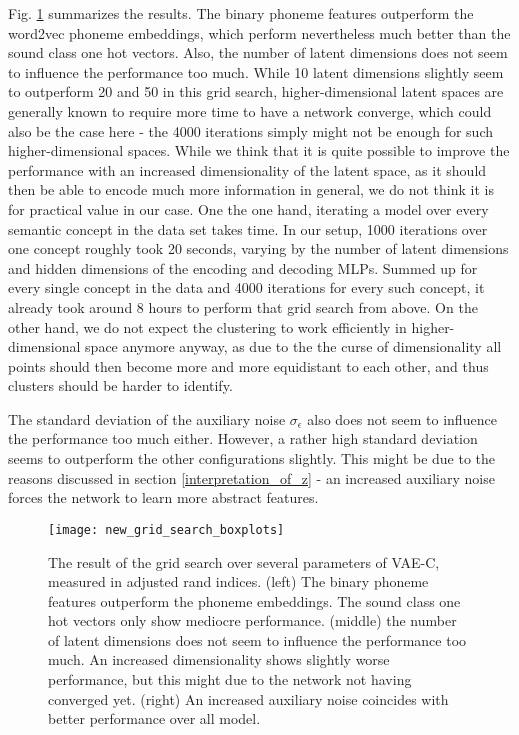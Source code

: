 \documentclass[6pt]{article}
\begin{document}
Fig. \ref{fig:grid_search_boxplots} summarizes the results. The binary phoneme features outperform the word2vec phoneme embeddings, which perform nevertheless much better than the sound class one hot vectors. Also, the number of latent dimensions does not seem to influence the performance too much. While 10 latent dimensions slightly seem to outperform 20 and 50 in this grid search, higher-dimensional latent spaces are generally known to require more time to have a network converge, which could also be the case here - the 4000 iterations simply might not be enough for such higher-dimensional spaces. While we think that it is quite possible to improve the performance with an increased dimensionality of the latent space, as it should then be able to encode much more information in general, we do not think it is for practical value in our case. One the one hand, iterating a model over every semantic concept in the data set takes time. In our setup, 1000 iterations over one concept roughly took 20 seconds, varying by the number of latent dimensions and hidden dimensions of the encoding and decoding MLPs. Summed up for every single concept in the data and 4000 iterations for every such concept, it already took around 8 hours to perform that grid search from above. On the other hand, we do not expect the clustering to work efficiently in higher-dimensional space anymore anyway, as due to the the curse of dimensionality all points should then become more and more equidistant to each other, and thus clusters should be harder to identify. %

The standard deviation of the auxiliary noise $\sigma_{\epsilon}$ also does not seem to influence the performance too much either. However, a rather high standard deviation seems to outperform the other configurations slightly. This might be due to the reasons discussed in section \ref{interpretation_of_z} - an increased auxiliary noise forces the network to learn more abstract features.

 \begin{figure}[h!] 
     \texttt{[image: new\_grid\_search\_boxplots]} 
     \caption{The result of the grid search over several parameters of VAE-C, measured in adjusted rand indices. (left) The binary phoneme features outperform the phoneme embeddings. The sound class one hot vectors only show mediocre performance. (middle) the number of latent dimensions does not seem to influence the performance too much. An increased dimensionality shows slightly worse performance, but this might due to the network not having converged yet. (right) An increased auxiliary noise coincides with better performance over all model.}
    \label{fig:grid_search_boxplots} 
\end{figure}
\end{document}
